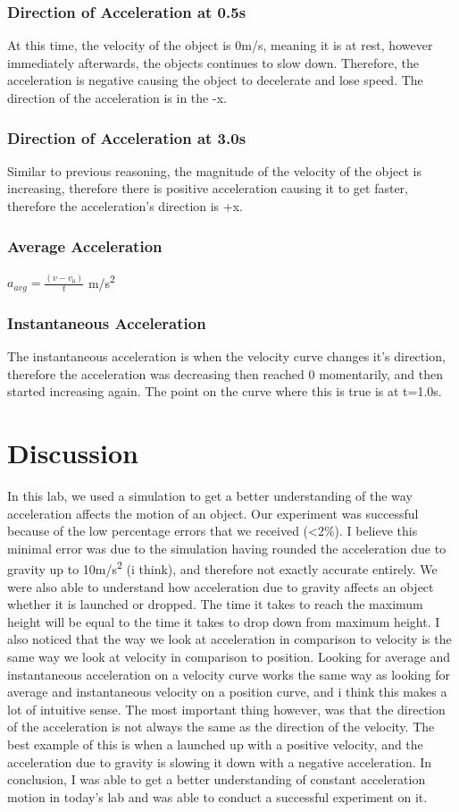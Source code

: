 \documentclass{article}
\begin{document}
\subsubsection{Direction of Acceleration at 0.5s} At this time, the velocity of the object is 0m/s, meaning it is at rest, however immediately afterwards, the objects continues to slow down. Therefore, the acceleration is negative causing the object to decelerate and lose speed. The direction of the acceleration is in the -x. 
\subsubsection{Direction of Acceleration at 3.0s} Similar to previous reasoning, the magnitude of the velocity of the object is increasing, therefore there is positive acceleration causing it to get faster, therefore the acceleration's direction is +x. 
\subsubsection{Average Acceleration} \(a_{avg} = \frac{(v-v_0)}{t}\) \Rightarrow {} \Rightarrow {}\si[per-mode=symbol]{\meter\per\second\squared}  
\subsubsection{Instantaneous Acceleration} The instantaneous acceleration is when the velocity curve changes it's direction, therefore the acceleration was decreasing then reached 0 momentarily, and then started increasing again. The point on the curve where this is true is at t=1.0s. 
\section{Discussion} 
In this lab, we used a simulation to get a better understanding of the way acceleration affects the motion of an object. Our experiment was successful because of the low percentage errors that we received (<2\%). I believe this minimal error was due to the simulation having rounded the acceleration due to gravity up to 10\si[per-mode=symbol]{\meter\per\second\squared} (i think), and therefore not exactly accurate entirely. We were also able to understand how acceleration due to gravity affects an object whether it is launched or dropped. The time it takes to reach the maximum height will be equal to the time it takes to drop down from maximum height. I also noticed that the way we look at acceleration in comparison to velocity is the same way we look at velocity in comparison to position. Looking for average and instantaneous acceleration on a velocity curve works the same way as looking for average and instantaneous velocity on a position curve, and i think this makes a lot of intuitive sense. The most important thing however, was that the direction of the acceleration is not always the same as the direction of the velocity. The best example of this is when a launched up with a positive velocity, and the acceleration due to gravity is slowing it down with a negative acceleration. In conclusion, I was able to get a better understanding of constant acceleration motion in today's lab and was able to conduct a successful experiment on it. 
\end{document}
